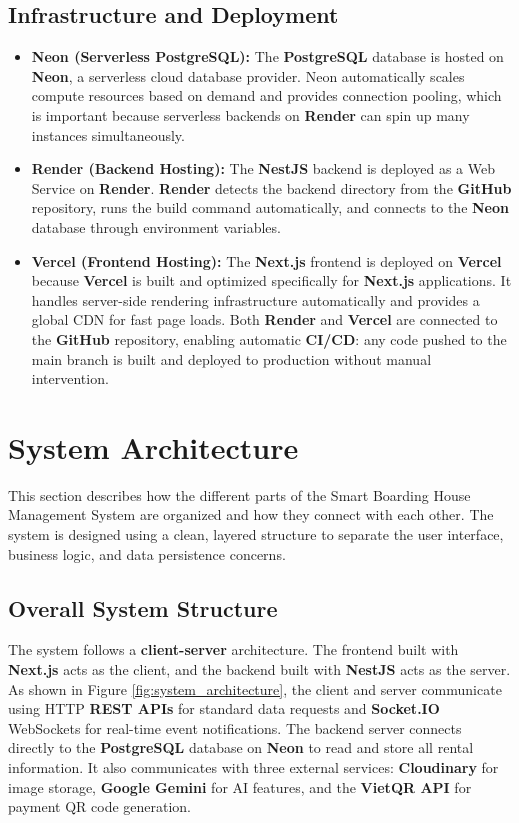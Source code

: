 \subsection{Infrastructure and Deployment}
\begin{itemize}
    \item \textbf{Neon (Serverless PostgreSQL):} The \textbf{PostgreSQL} database is hosted on \textbf{Neon}, a serverless cloud database provider. Neon automatically scales compute resources based on demand and provides connection pooling, which is important because serverless backends on \textbf{Render} can spin up many instances simultaneously.

    \item \textbf{Render (Backend Hosting):} The \textbf{NestJS} backend is deployed as a Web Service on \textbf{Render}. \textbf{Render} detects the backend directory from the \textbf{GitHub} repository, runs the build command automatically, and connects to the \textbf{Neon} database through environment variables.

    \item \textbf{Vercel (Frontend Hosting):} The \textbf{Next.js} frontend is deployed on \textbf{Vercel} because \textbf{Vercel} is built and optimized specifically for \textbf{Next.js} applications. It handles server-side rendering infrastructure automatically and provides a global CDN for fast page loads. Both \textbf{Render} and \textbf{Vercel} are connected to the \textbf{GitHub} repository, enabling automatic \textbf{CI/CD}: any code pushed to the main branch is built and deployed to production without manual intervention.
\end{itemize}


\section{System Architecture}

This section describes how the different parts of the Smart Boarding House Management System are organized and how they connect with each other. The system is designed using a clean, layered structure to separate the user interface, business logic, and data persistence concerns.

\subsection{Overall System Structure}
The system follows a \textbf{client-server} architecture. The frontend built with \textbf{Next.js} acts as the client, and the backend built with \textbf{NestJS} acts as the server. As shown in Figure \ref{fig:system_architecture}, the client and server communicate using HTTP \textbf{REST APIs} for standard data requests and \textbf{Socket.IO} WebSockets for real-time event notifications. The backend server connects directly to the \textbf{PostgreSQL} database on \textbf{Neon} to read and store all rental information. It also communicates with three external services: \textbf{Cloudinary} for image storage, \textbf{Google Gemini} for AI features, and the \textbf{VietQR API} for payment QR code generation.


